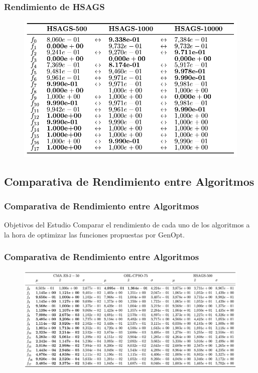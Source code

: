 \begin{frame}
\frametitle{Rendimiento de HSAGS}
\begin{figure}
  \centering
	\includegraphics[scale=0.4]{img/hsags}
\end{figure}
\end{frame}

\subsection{Comparativa de Rendimiento entre Algoritmos}
\begin{frame}
\frametitle{Comparativa de Rendimiento entre Algoritmos}
\begin{block}{Objetivos del Estudio}
Comparar el rendimiento de cada uno de los algoritmos a la hora de optimizar las funciones propuestas por GenOpt.
\end{block}
\end{frame}

\begin{frame}
\frametitle{Comparativa de Rendimiento entre Algoritmos}
\begin{figure}
  \centering
	\includegraphics[scale=0.3]{img/finalcmp}
\end{figure}
\end{frame}

